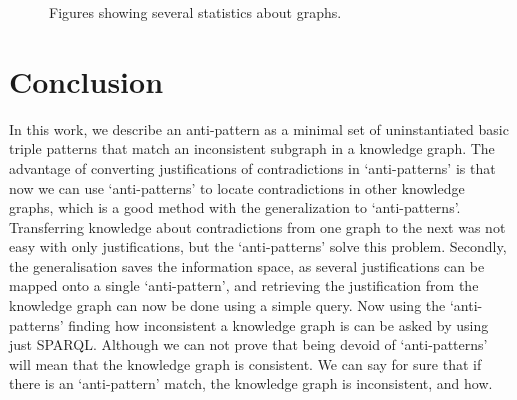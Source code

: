 \documentclass[11pt,letterpaper ,oneside ]{book}
\begin{document}
\begin{figure}[!t]
	\caption{Figures showing several statistics about graphs.}
	\label{fig:GraphStats}
\end{figure}

	
	\newpage
	
	
	\chapter{Conclusion}\label{Conclusion}
	In this work, we describe an anti-pattern as a minimal set of uninstantiated basic triple patterns that match an inconsistent subgraph in a knowledge graph. The advantage of converting justifications of contradictions in `anti-patterns' is that now we can use `anti-patterns' to locate contradictions in other knowledge graphs, which is a good method with the generalization to `anti-patterns'. Transferring knowledge about contradictions from one graph to the next was not easy with only justifications, but the `anti-patterns' solve this problem. 
	Secondly, the generalisation saves the information space, as several justifications can be mapped onto a single `anti-pattern', and retrieving the justification from the knowledge graph can now be done using a simple query. Now using the `anti-patterns' finding how inconsistent a knowledge graph is can be asked by using just SPARQL. Although we can not prove that being devoid of `anti-patterns' will mean that the knowledge graph is consistent. We can say for sure that if there is an `anti-pattern' match, the knowledge graph is inconsistent, and how.  \\
	
\end{document}

